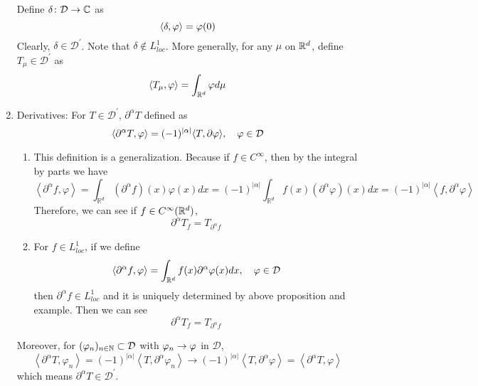 \begin{enumerate}[label=\arabic*.]
	\begin{exam}
		Define $\delta \colon \mathcal{D} \rightarrow \mathbb{C}$ as
		\begin{equation*}
			\langle \delta,\varphi \rangle = \varphi(0)
		\end{equation*}
		Clearly, $\delta \in \mathcal{D}^\prime$. Note that $\delta \notin L^1_{loc}$. More generally, for any $\mu$ on $\mathbb{R}^d$, define $T_\mu \in \mathcal{D}^\prime$ as
		\begin{equation*}
			\langle T_\mu,\varphi \rangle = \int_{\mathbb{R}^d}\varphi d\mu
		\end{equation*}
	\end{exam}	

	\item Derivatives: For $T \in \mathcal{D}^\prime$, $\partial^\alpha T$ defined as
	\begin{equation*}
		\langle \partial^\alpha T, \varphi \rangle = (-1)^{\left\lvert\alpha\right\lvert}\langle T,\partial \varphi \rangle,\quad \varphi \in \mathcal{D}
	\end{equation*}
	\begin{rmk}
		\begin{enumerate}[label=(\arabic{*})]
			\item This definition is a generalization. Because if $f \in C^\infty$, then by the integral by parts we have
			\begin{equation*}
				\left\langle\partial^\alpha f, \varphi\right\rangle=\int_{\mathbb{R}^d}\left(\partial^\alpha f\right)(x) \varphi(x) d x=(-1)^{|\alpha|} \int_{\mathbb{R}^d} f(x)\left(\partial^\alpha \varphi\right)(x) d x=(-1)^{|\alpha|}\left\langle f, \partial^\alpha \varphi\right\rangle
			\end{equation*}
			Therefore, we can see if $f \in C^\infty(\mathbb{R}^d)$,
			\begin{equation*}
				\partial^\alpha T_f = T_{\partial^\alpha f}
			\end{equation*}
			\item For $f \in L^1_{loc}$, if we define
			\begin{equation*}
				\langle \partial^\alpha f, \varphi \rangle = \int_{\mathbb{R}^d} f(x)\partial^\alpha \varphi(x)dx,\quad \varphi \in \mathcal{D}
			\end{equation*}
			then $\partial^\alpha f \in L^1_{loc}$ and it is uniquely determined by above proposition and example. Then we can see
			\begin{equation*}
				\partial^\alpha T_f = T_{\partial^\alpha f}
			\end{equation*}
		\end{enumerate}
	\end{rmk}
	Moreover, for $(\varphi_n)_{n \in \mathbb{N}} \subset \mathcal{D}$ with $\varphi_n \rightarrow \varphi$ in $\mathcal{D}$,
	\begin{equation*}
		\left\langle\partial^\alpha T, \varphi_n\right\rangle=(-1)^{|\alpha|}\left\langle T, \partial^\alpha \varphi_n\right\rangle \rightarrow(-1)^{|\alpha|}\left\langle T, \partial^\alpha \varphi\right\rangle=\left\langle\partial^\alpha T, \varphi\right\rangle
	\end{equation*}
	which means $\partial^\alpha T \in \mathcal{D}^\prime$. 


\end{enumerate}
